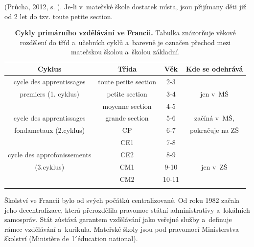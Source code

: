 		(Průcha, 2012, s. ). 
		Je-li v~mateřské škole dostatek místa, jsou přijímany děti již od 2 let do tzv. toute petite section. 

\begin{spacing}{1.0}
\begin{table}[h]
	\center
	\small
	\begin{center}
	\begin{tabular}{|c|ccc|}
		\hline
		\rowcolor{grey}
		\textbf{Cyklus}				& \textbf{Třída}		& \textbf{Věk}	& \textbf{Kde se odehrává}	\\
		\hline
		\hline
		\rowcolor{grey!10}
	\cellcolor{white} cycle des apprentissages	& toute petite section 	& 2-3 		&				\\ \rowcolor{grey!20}
	\cellcolor{white} premiers (1. cyklus)		& petite section 		& 3-4 		& jen v~MŠ 		\\ \rowcolor{grey!20}
	\cellcolor{white}							& moyenne section 		& 4-5 		& 				\\ \rowcolor{grey!20}
		\hline
	\cellcolor{white} cycle des apprentissages 	& grande section 		& 5-6 		& začíná v~MŠ, 		\\ \rowcolor{grey!50}
	\cellcolor{white} fondametaux (2.cyklus) 		& CP 					& 6-7 		& pokračuje na ZŠ 	\\ \rowcolor{grey!50}
	\cellcolor{white}								& CE1 					& 7-8 		& 					\\ \rowcolor{grey!50}
		\hline
	\cellcolor{white} cycle des approfonissements & CE2 					& 8-9 		&					\\ \rowcolor{grey!50}
	\cellcolor{white} (3.cyklus)					& CM1 					& 9-10 		& jen v~ZŠ 			\\ \rowcolor{grey!50}
	\cellcolor{white}								& CM2 					& 10-11 	& 					\\ \rowcolor{grey!50}
		\hline
	\end{tabular}
	\end{center}
	\caption{ \textbf{Cykly primárního vzdělávání ve Francii.} Tabulka znázorňuje věkové rozdělení do tříd a~učebních cyklů a~barevně je označen přechod mezi mateřskou školou a~školou základní. 
	}
	\label{tab:rozdeleniTridFR}
\end{table}
\end{spacing}
		Školství ve Francii bylo od svých počátků centralizované. Od roku 1982 začala jeho decentralizace, která přerozdělila pravomoc státní administrativy a~lokálních samospráv. Stát zůstává garantem vzdělávání jako veřejné služby a~definuje rámec vzdělávání a kurikula. Mateřské školy jsou pod pravomocí Ministerstva školství (Ministère de l´éducation national).


